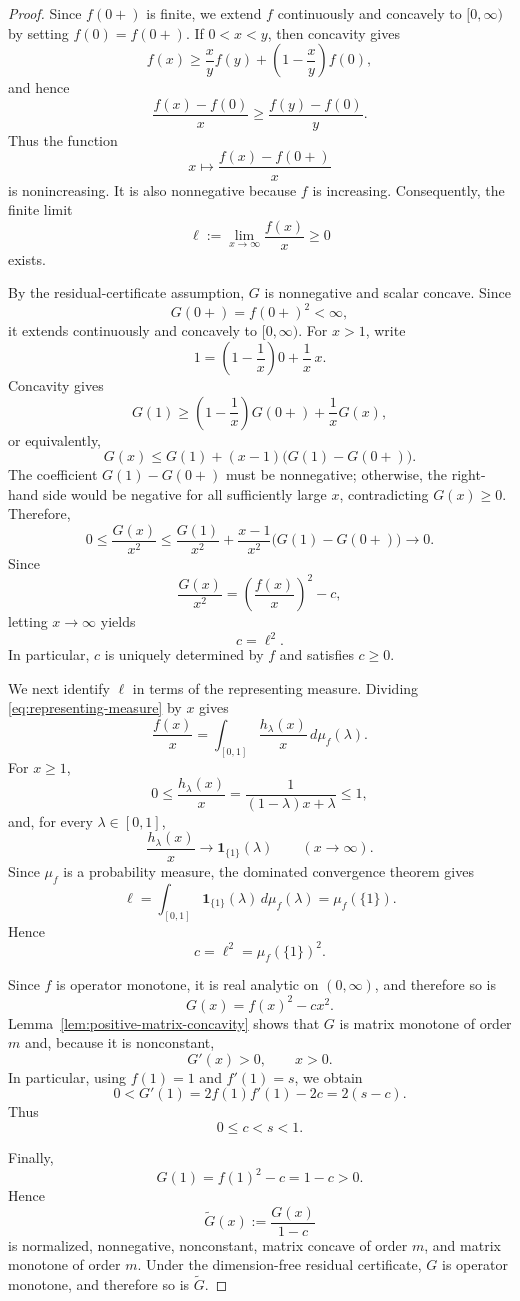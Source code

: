 \documentclass[11pt]{amsart}
\theoremstyle{definition}
\theoremstyle{remark}
\begin{document}
 \begin{proof}
		Since $f(0+)$ is finite, we extend $f$ continuously and concavely to
		$[0,\infty)$ by setting $f(0)=f(0+)$.  If $0<x<y$, then concavity gives
		\[
		f(x)
		\ge \frac{x}{y}f(y)
		+\left(1-\frac{x}{y}\right)f(0),
		\]
		and hence
		\[
		\frac{f(x)-f(0)}{x}
		\ge
		\frac{f(y)-f(0)}{y}.
		\]
		Thus the function
		\[
		x\longmapsto\frac{f(x)-f(0+)}{x}
		\]
		is nonincreasing.  It is also nonnegative because $f$ is increasing.
		Consequently, the finite limit
		\[
		\ell:=\lim_{x\to\infty}\frac{f(x)}{x}\ge0
		\]
		exists.
		
		By the residual-certificate assumption, $G$ is nonnegative and
		scalar concave.  Since
		\[
		G(0+)=f(0+)^2<\infty,
		\]
		it extends continuously and concavely to $[0,\infty)$.  For $x>1$,
		write
		\[
		1=\left(1-\frac1x\right)0+\frac1x\,x.
		\]
		Concavity gives
		\[
		G(1)
		\ge
		\left(1-\frac1x\right)G(0+)+\frac1xG(x),
		\]
		or equivalently,
		\[
		G(x)
		\le
		G(1)+(x-1)\bigl(G(1)-G(0+)\bigr).
		\]
		The coefficient $G(1)-G(0+)$ must be nonnegative; otherwise, the
		right-hand side would be negative for all sufficiently large $x$,
		contradicting $G(x)\ge0$.  Therefore,
		\[
		0\le\frac{G(x)}{x^2}
		\le
		\frac{G(1)}{x^2}
		+\frac{x-1}{x^2}\bigl(G(1)-G(0+)\bigr)
		\longrightarrow0.
		\]
		Since
		\[
		\frac{G(x)}{x^2}
		=\left(\frac{f(x)}{x}\right)^2-c,
		\]
		letting $x\to\infty$ yields
		\[
		c=\ell^2.
		\]
		In particular, $c$ is uniquely determined by $f$ and satisfies
		$c\ge0$.
		
		We next identify $\ell$ in terms of the representing measure.  Dividing
		\eqref{eq:representing-measure} by $x$ gives
		\[
		\frac{f(x)}{x}
		=\int_{[0,1]}
		\frac{h_\lambda(x)}{x}\,d\mu_f(\lambda).
		\]
		For $x\ge1$,
		\[
		0\le\frac{h_\lambda(x)}{x}
		=\frac{1}{(1-\lambda)x+\lambda}\le1,
		\]
		and, for every $\lambda\in[0,1]$,
		\[
		\frac{h_\lambda(x)}{x}
		\longrightarrow
		\mathbf 1_{\{1\}}(\lambda)
		\qquad (x\to\infty).
		\]
		Since $\mu_f$ is a probability measure, the dominated convergence
		theorem gives
		\[
		\ell
		=\int_{[0,1]}\mathbf 1_{\{1\}}(\lambda)\,d\mu_f(\lambda)
		=\mu_f(\{1\}).
		\]
		Hence
		\[
		c=\ell^2=\mu_f(\{1\})^2.
		\]
		
		Since $f$ is operator monotone, it is real analytic on $(0,\infty)$,
		and therefore so is
		\[
		G(x)=f(x)^2-cx^2.
		\]
		Lemma~\ref{lem:positive-matrix-concavity} shows that $G$ is matrix
		monotone of order $m$ and, because it is nonconstant,
		\[
		G'(x)>0,\qquad x>0.
		\]
		In particular, using $f(1)=1$ and $f'(1)=s$, we obtain
		\[
		0<G'(1)=2f(1)f'(1)-2c=2(s-c).
		\]
		Thus
		\[
		0\le c<s<1.
		\]
		
		Finally,
		\[
		G(1)=f(1)^2-c=1-c>0.
		\]
		Hence
		\[
		\widetilde G(x):=\frac{G(x)}{1-c}
		\]
		is normalized, nonnegative, nonconstant, matrix concave of order $m$,
		and matrix monotone of order $m$.  Under the dimension-free residual
		certificate, $G$ is operator monotone, and therefore so is
		$\widetilde G$.
\end{proof}
\end{document}
